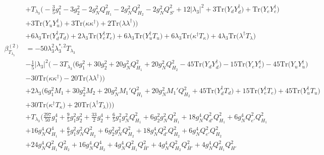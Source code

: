 {\begin{align}
 &+T_{\lambda_3} \Big(-\frac{3}{5} g_{1}^{2} -3 g_{2}^{2} -2 g_{N}^{2} Q_{H_1}^{2} -2 g_{N}^{2} Q_{H_2}^{2} -2 g_{N}^{2} Q_{S'}^{2} +12 |\lambda_3|^2 +3 \mbox{Tr}\Big({Y_d  Y_{d}^{\dagger}}\Big) +\mbox{Tr}\Big({Y_e  Y_{e}^{\dagger}}\Big)\nonumber \\ 
 &+3 \mbox{Tr}\Big({Y_u  Y_{u}^{\dagger}}\Big) +3 \mbox{Tr}\Big({\kappa  \kappa^{\dagger}}\Big) +2 \mbox{Tr}\Big({\lambda  \lambda^{\dagger}}\Big) \Big)\nonumber \\ 
 &+6 \lambda_3 \mbox{Tr}\Big({Y_{d}^{\dagger}  T_d}\Big) +2 \lambda_3 \mbox{Tr}\Big({Y_{e}^{\dagger}  T_e}\Big) +6 \lambda_3 \mbox{Tr}\Big({Y_{u}^{\dagger}  T_u}\Big) +6 \lambda_3 \mbox{Tr}\Big({\kappa^{\dagger}  T_{\kappa}}\Big) +4 \lambda_3 \mbox{Tr}\Big({\lambda^{\dagger}  T_{\lambda}}\Big) \\ 
\beta_{T_{\lambda_3}}^{(2)} & =  
-50 \lambda_{3}^{2} \lambda_{3}^{*,2} T_{\lambda_3} \nonumber \\ 
 &-\frac{1}{5} |\lambda_3|^2 \Big(-3 T_{\lambda_3} \Big(6 g_{1}^{2} +30 g_{2}^{2} +20 g_{N}^{2} Q_{H_1}^{2} +20 g_{N}^{2} Q_{H_2}^{2} -45 \mbox{Tr}\Big({Y_d  Y_{d}^{\dagger}}\Big) -15 \mbox{Tr}\Big({Y_e  Y_{e}^{\dagger}}\Big) -45 \mbox{Tr}\Big({Y_u  Y_{u}^{\dagger}}\Big) \nonumber \\ 
 &-30 \mbox{Tr}\Big({\kappa  \kappa^{\dagger}}\Big) -20 \mbox{Tr}\Big({\lambda  \lambda^{\dagger}}\Big) \Big)\nonumber \\ 
 &+2 \lambda_3 \Big(6 g_{1}^{2} M_1 +30 g_{2}^{2} M_2 +20 g_{N}^{2} M_1' Q_{H_1}^{2} +20 g_{N}^{2} M_1' Q_{H_2}^{2} +45 \mbox{Tr}\Big({Y_{d}^{\dagger}  T_d}\Big) +15 \mbox{Tr}\Big({Y_{e}^{\dagger}  T_e}\Big) +45 \mbox{Tr}\Big({Y_{u}^{\dagger}  T_u}\Big) \nonumber \\ 
 &+30 \mbox{Tr}\Big({\kappa^{\dagger}  T_{\kappa}}\Big) +20 \mbox{Tr}\Big({\lambda^{\dagger}  T_{\lambda}}\Big) \Big)\Big)\nonumber \\ 
 &+T_{\lambda_3} \Big(\frac{297}{50} g_{1}^{4} +\frac{9}{5} g_{1}^{2} g_{2}^{2} +\frac{33}{2} g_{2}^{4} +\frac{6}{5} g_{1}^{2} g_{N}^{2} Q_{H_1}^{2} +6 g_{2}^{2} g_{N}^{2} Q_{H_1}^{2} +18 g_{N}^{4} Q_{d'}^{2} Q_{H_1}^{2} +6 g_{N}^{4} Q_{e'}^{2} Q_{H_1}^{2} \nonumber \\ 
 &+16 g_{N}^{4} Q_{H_1}^{4} +\frac{6}{5} g_{1}^{2} g_{N}^{2} Q_{H_2}^{2} +6 g_{2}^{2} g_{N}^{2} Q_{H_2}^{2} +18 g_{N}^{4} Q_{d'}^{2} Q_{H_2}^{2} +6 g_{N}^{4} Q_{e'}^{2} Q_{H_2}^{2} \nonumber \\ 
 &+24 g_{N}^{4} Q_{H_1}^{2} Q_{H_2}^{2} +16 g_{N}^{4} Q_{H_2}^{4} +4 g_{N}^{4} Q_{H_1}^{2} Q_{\bar{H}'}^{2} +4 g_{N}^{4} Q_{H_2}^{2} Q_{\bar{H}'}^{2} +4 g_{N}^{4} Q_{H_1}^{2} Q_{H'}^{2} \nonumber \\ 

\end{align}}
